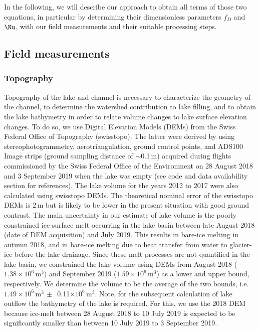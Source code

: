 In the following, we will describe our approach to obtain all terms of those two equations, in particular by determining their dimensionless parameters $f_D$ and $\Nu$, with our field measurements and their suitable processing steps.


\subsection{Field measurements}

\subsubsection{Topography}

Topography of the lake and channel is necessary to characterize the geometry of the channel, to determine the watershed contribution to lake filling, and to obtain the lake bathymetry in order to relate volume changes to lake surface elevation changes. To do so, we use Digital Elevation Models (DEMs) from the Swiss Federal Office of Topography (swisstopo). The latter were derived by using stereophotogrammetry, aerotriangulation, ground control points, and ADS100 Image strips (ground sampling distance of $\sim$0.1\,m) acquired during flights commissioned by the Swiss Federal Office of the Environment on 28 August 2018 and 3 September 2019 when the lake was empty (see code and data availability section for references). The lake volume for the years 2012 to 2017 were also calculated using swisstopo DEMs. The theoretical nominal error of the swisstopo DEMs is 2\,m but is likely to be lower in the present situation with good ground contrast. The main uncertainty in our estimate of lake volume is the poorly constrained ice-surface melt occurring in the lake basin between late August 2018 (date of DEM acquisition) and July 2019. This results in bare-ice melting in autumn 2018, and in bare-ice melting due to heat transfer from water to glacier-ice before the lake drainage. Since these melt processes are not quantified in the lake basin, we constrained the lake volume using DEMs from August 2018 ($1.38\times10^6$\,m$^3$) and September 2019 ($1.59\times10^6$\,m$^3$) as a lower and upper bound, respectively. We determine the volume to be the average of the two bounds, i.e. $1.49\times10^6$\,m$^3\,\pm\,$ 0.11$\times10^6$\,m$^3$. Note, for the subsequent calculation of lake outflow the bathymetry of the lake is required. For this, we use the 2018 DEM because ice-melt between 28 August 2018 to 10 July 2019 is expected to be significantly smaller than between 10 July 2019 to 3 September 2019.




